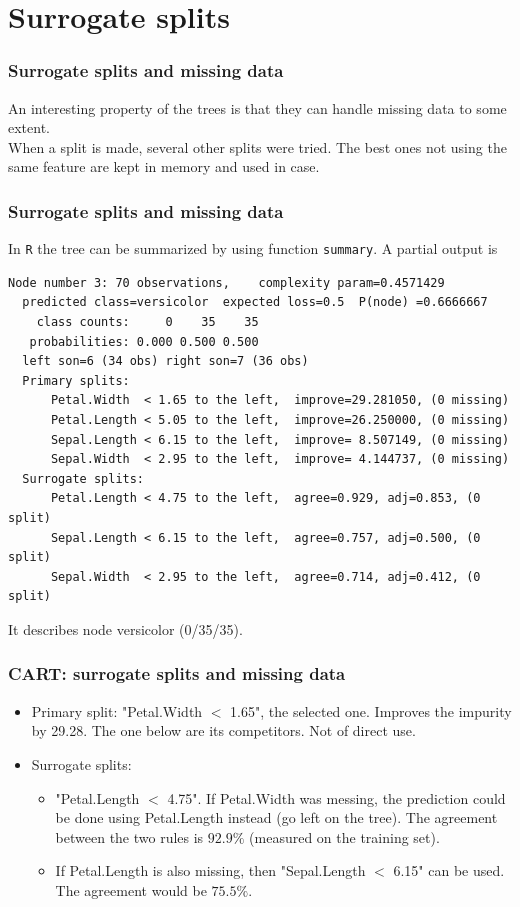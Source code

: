\section{Surrogate splits}
\begin{frame}[fragile]
\frametitle{Surrogate splits and missing data}
An interesting property of the trees is that they can handle missing data to some extent. \\
\vspace{0.3cm}
When a split is made, several other splits were tried. The best ones not using the same feature are kept in memory and used in case.
\end{frame}
\begin{frame}[fragile]
\frametitle{Surrogate splits and missing data}
In {\tt R} the tree can be summarized by using function {\tt summary}. A partial output is\\
\tiny
\begin{verbatim}
Node number 3: 70 observations,    complexity param=0.4571429
  predicted class=versicolor  expected loss=0.5  P(node) =0.6666667
    class counts:     0    35    35
   probabilities: 0.000 0.500 0.500 
  left son=6 (34 obs) right son=7 (36 obs)
  Primary splits:
      Petal.Width  < 1.65 to the left,  improve=29.281050, (0 missing)
      Petal.Length < 5.05 to the left,  improve=26.250000, (0 missing)
      Sepal.Length < 6.15 to the left,  improve= 8.507149, (0 missing)
      Sepal.Width  < 2.95 to the left,  improve= 4.144737, (0 missing)
  Surrogate splits:
      Petal.Length < 4.75 to the left,  agree=0.929, adj=0.853, (0 split)
      Sepal.Length < 6.15 to the left,  agree=0.757, adj=0.500, (0 split)
      Sepal.Width  < 2.95 to the left,  agree=0.714, adj=0.412, (0 split)
\end{verbatim}
\normalsize
It describes node versicolor (0/35/35).
\end{frame}
\begin{frame}[fragile]
\frametitle{CART: surrogate splits and missing data}
\begin{itemize}
\item Primary split: "Petal.Width $<$ 1.65", the selected one. Improves the impurity by 29.28. The one below are its competitors. Not of direct use.
\item Surrogate splits: 
\begin{itemize}
\item "Petal.Length $<$ 4.75". If Petal.Width was messing, the prediction could be done using Petal.Length instead (go left on the tree). The agreement between the two rules is $92.9\%$ (measured on the training set). 
\item If Petal.Length is also missing, then "Sepal.Length $<$ 6.15" can be used. The agreement would be $75.5\%$.
\end{itemize}
\end{itemize}
\end{frame}
